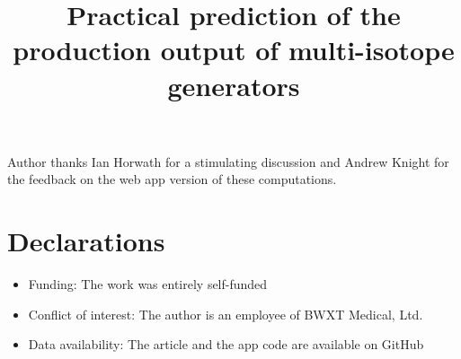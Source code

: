 \documentclass[pdflatex,sn-mathphys-num]{sn-jnl}%
\theoremstyle{thmstyleone}%
\theoremstyle{thmstyletwo}%
\theoremstyle{thmstylethree}%
\begin{document}
\title[]{Practical prediction of the production output of multi-isotope generators}

\author*[1]{ }



\maketitle




\backmatter

Author thanks Ian Horwath for a stimulating discussion and Andrew Knight for the feedback on the web app version of these computations.

\section*{Declarations}

\begin{itemize}
\item Funding: The work was entirely self-funded
\item Conflict of interest: The author is an employee of BWXT Medical, Ltd.
\item Data availability: The article and the app code are available on GitHub
\end{itemize}


\end{document}
